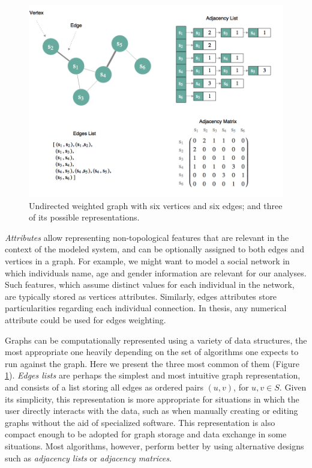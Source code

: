   \begin{figure}[h!]
  	\centering
    \includegraphics[width=0.9\linewidth]{figures/network_models/graphs.png}
    \caption{Undirected weighted graph with six vertices and six edges; and three of its possible representations.}
    \label{fig:graphs}
  \end{figure}
  
\textit{Attributes} allow representing non-topological features that are relevant in the context of the modeled system, and can be optionally assigned to both edges and vertices in a graph.
For example, we might want to model a social network in which individuals name, age and gender information are relevant for our analyses.
Such features, which assume distinct values for each individual in the network, are typically stored as vertices attributes.
Similarly, edges attributes store particularities regarding each individual connection.
In thesis, any numerical attribute could be used for edges weighting.

Graphs can be computationally represented using a variety of data structures, the most appropriate one heavily depending on the set of algorithms one expects to run against the graph.
Here we present the three most common of them (Figure \ref{fig:graphs}).
%
\textit{Edges lists} are perhaps the simplest and most intuitive graph representation, and consists of a list storing all edges as ordered pairs $(u,v)$, for $u,v \in S$.
Given its simplicity, this representation is more appropriate for situations in which the user directly interacts with the data, such as when manually creating or editing graphs without the aid of specialized software. 
This representation is also compact enough to be adopted for graph storage and data exchange in some situations.
%
Most algorithms, however, perform better by using alternative designs such as \textit{adjacency lists} or \textit{adjacency matrices}. 



